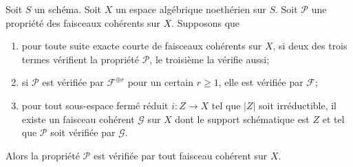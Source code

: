 \begin{lemma}
\label{lemma-property-higher-rank-cohomological-variant}
Soit $S$ un schéma. Soit $X$ un espace algébrique noethérien sur $S$.
Soit $\mathcal{P}$ une propriété des faisceaux cohérents sur $X$. Supposons que
\begin{enumerate}
\item pour toute suite exacte courte de faisceaux cohérents sur $X$,
si deux des trois termes vérifient la propriété $\mathcal{P}$, le troisième la vérifie aussi;
\item si $\mathcal{P}$ est vérifiée par $\mathcal{F}^{\oplus r}$ pour
un certain $r \geq 1$, elle est vérifiée par $\mathcal{F}$;
\item pour tout sous-espace fermé réduit $i : Z \to X$ tel que
$|Z|$ soit irréductible, il existe un faisceau cohérent $\mathcal{G}$ sur $X$
dont le support schématique est $Z$ et tel que $\mathcal{P}$ soit vérifiée par
$\mathcal{G}$.
\end{enumerate}
Alors la propriété $\mathcal{P}$ est vérifiée par tout faisceau cohérent sur $X$.
\end{lemma}

